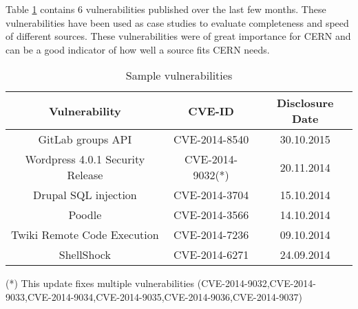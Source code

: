 Table \ref{table:sample_vulns} contains 6 vulnerabilities published over the last few months. These vulnerabilities have been used as case studies to evaluate completeness and speed of different sources. These vulnerabilities were of great importance for CERN and can be a good indicator of how well a source fits CERN needs.
\begin{table}
\begin{center}
    \begin{tabular}{ | c | c | c| }
    
    \hline
    \hhline{|*3-}
	\rowcolor{LightBlue}    
    \textbf{Vulnerability} & \textbf{CVE-ID} & \textbf{Disclosure Date} 
    \\ \hline
    GitLab groups API & CVE-2014-8540 & 30.10.2015
      \\ \hline
    Wordpress 4.0.1 Security Release & CVE-2014-9032(*)  & 20.11.2014
    \\ \hline
    Drupal SQL injection
 & CVE-2014-3704
 & 15.10.2014 
  \\
    \hline

 Poodle
 & CVE-2014-3566
 & 14.10.2014
  \\
    \hline

Twiki Remote Code Execution
 & CVE-2014-7236
 & 09.10.2014
 \\
    \hline

ShellShock
 & CVE-2014-6271
 & 24.09.2014
  \\
    \hline

    \end{tabular}
    \caption{Sample vulnerabilities}
    \label{table:sample_vulns}
     \footnotesize{(*) This update fixes multiple vulnerabilities (CVE-2014-9032,CVE-2014-9033,CVE-2014-9034,CVE-2014-9035,CVE-2014-9036,CVE-2014-9037)}
   \end{center}
   
\end{table}


